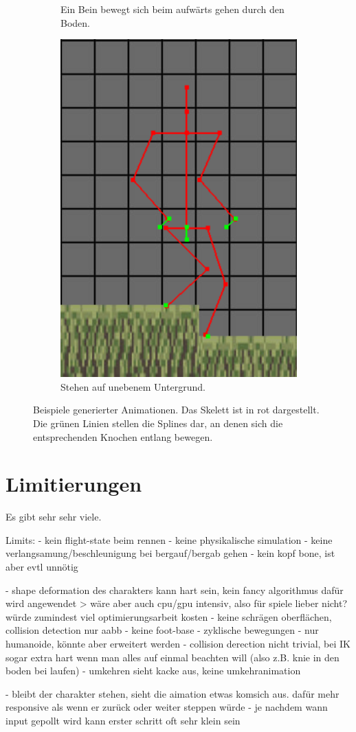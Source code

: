 \begin{figure}
\begin{subfigure}[t]{.4\linewidth}
        \caption{Ein Bein bewegt sich beim aufwärts gehen durch den Boden.}
        \label{clip_through_ground}
    \end{subfigure}
    \begin{subfigure}[t]{.4\linewidth}
        \centering
        \includegraphics[width=0.75\linewidth]{images/standing_uneven.png}
        \caption{Stehen auf unebenem Untergrund.}
        \label{standing_uneven}
    \end{subfigure}
    \caption{Beispiele generierter Animationen. Das Skelett ist in rot dargestellt. Die grünen Linien stellen die Splines dar, an denen sich die entsprechenden Knochen entlang bewegen.}
\end{figure}

\section{Limitierungen}
Es gibt sehr sehr viele.

Limits:
- kein flight-state beim rennen
- keine physikalische simulation
- keine verlangsamung/beschleunigung bei bergauf/bergab gehen
- kein kopf bone, ist aber evtl unnötig

- shape deformation des charakters kann hart sein, kein fancy algorithmus dafür wird angewendet
> wäre aber auch cpu/gpu intensiv, also für spiele lieber nicht? würde zumindest viel optimierungsarbeit kosten
- keine schrägen oberflächen, collision detection nur aabb
- keine foot-base
- zyklische bewegungen
- nur humanoide, könnte aber erweitert werden
- collision derection nicht trivial, bei IK sogar extra hart wenn man alles auf einmal beachten will (also z.B. knie in den boden bei laufen)
- umkehren sieht kacke aus, keine umkehranimation

- bleibt der charakter stehen, sieht die aimation etwas komsich aus. dafür mehr responsive als wenn er zurück oder weiter steppen würde
- je nachdem wann input gepollt wird kann erster schritt oft sehr klein sein

